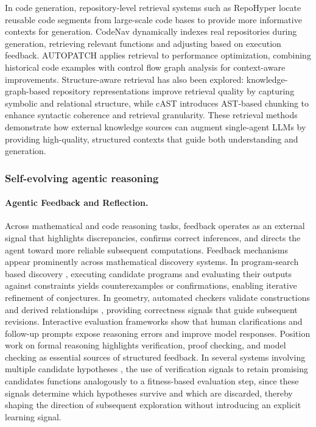 In code generation, repository-level retrieval systems 
such as RepoHyper \citep{phan2024repohyper} locate reusable code segments from large-scale code bases 
to provide more informative contexts for generation. CodeNav \citep{gupta2024codenav} dynamically 
indexes real repositories during generation, retrieving relevant functions and adjusting based on 
execution feedback. AUTOPATCH \citep{acharya2025optimizing} applies retrieval to performance 
optimization, combining historical code examples with control flow graph analysis for 
context-aware improvements. Structure-aware retrieval has also been explored: knowledge-graph-based 
repository representations \citep{athale2025knowledge} improve retrieval quality by capturing 
symbolic and relational structure, while cAST \citep{zhang2025cast} introduces AST-based chunking to 
enhance syntactic coherence and retrieval granularity. These retrieval methods demonstrate how 
external knowledge sources can augment single-agent LLMs by providing high-quality, structured 
contexts that guide both understanding and generation.

\subsubsection{Self-evolving agentic reasoning}
\label{sec:app-math-evolving}

\paragraph{Agentic Feedback and Reflection.}
Across mathematical and code reasoning tasks, feedback operates as an external signal that 
highlights discrepancies, confirms correct inferences, and directs the agent toward more reliable 
subsequent computations. Feedback mechanisms appear prominently across mathematical discovery systems. In program-search 
based discovery \citep{romera2024mathematical}, executing candidate programs and evaluating their 
outputs against constraints yields counterexamples or confirmations, enabling iterative refinement of 
conjectures. In geometry, automated checkers validate constructions and derived relationships 
\citep{trinh2024solving,hubert2024ai}, providing correctness signals that guide subsequent revisions. 
Interactive evaluation frameworks \citep{collins2024evaluating} show that human clarifications and 
follow-up prompts expose reasoning errors and improve model responses. Position work on formal 
reasoning \citep{yang2024formal} highlights verification, proof checking, and model checking as 
essential sources of structured feedback. In several systems involving multiple candidate hypotheses 
\citep{romera2024mathematical,ellenberg2025generative,georgiev2025mathematical}, 
the use of verification signals to retain promising candidates functions analogously 
to a fitness-based evaluation step, since these signals determine which hypotheses 
survive and which are discarded, thereby shaping the direction of subsequent exploration 
without introducing an explicit learning signal.

